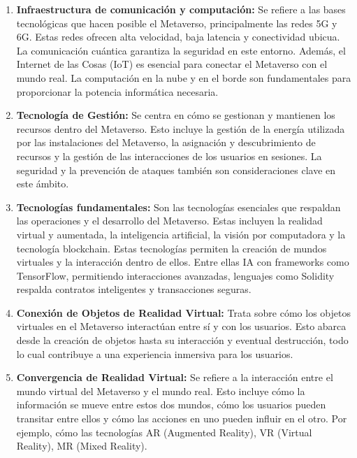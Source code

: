 \documentclass[a4paper,10pt]{article}
\begin{document}
	\begin{enumerate}
		\item \textbf{Infraestructura de comunicación y computación:} Se refiere a las bases tecnológicas que hacen posible el Metaverso, principalmente las redes 5G y 6G. Estas redes ofrecen alta velocidad, baja latencia y conectividad ubicua. La comunicación cuántica garantiza la seguridad en este entorno. Además, el Internet de las Cosas (IoT) es esencial para conectar el Metaverso con el mundo real. La computación en la nube y en el borde son fundamentales para proporcionar la potencia informática necesaria.
		
		\item \textbf{Tecnología de Gestión:} Se centra en cómo se gestionan y mantienen los recursos dentro del Metaverso. Esto incluye la gestión de la energía utilizada por las instalaciones del Metaverso, la asignación y descubrimiento de recursos y la gestión de las interacciones de los usuarios en sesiones. La seguridad y la prevención de ataques también son consideraciones clave en este ámbito.
		
		\item \textbf{Tecnologías fundamentales:} Son las tecnologías esenciales que respaldan las operaciones y el desarrollo del Metaverso. Estas incluyen la realidad virtual y aumentada, la inteligencia artificial, la visión por computadora y la tecnología blockchain. Estas tecnologías permiten la creación de mundos virtuales y la interacción dentro de ellos. Entre ellas IA con frameworks como TensorFlow, permitiendo interacciones avanzadas, lenguajes como Solidity respalda contratos inteligentes y transacciones seguras.
		
		\item \textbf{Conexión de Objetos de Realidad Virtual:} Trata sobre cómo los objetos virtuales en el Metaverso interactúan entre sí y con los usuarios. Esto abarca desde la creación de objetos hasta su interacción y eventual destrucción, todo lo cual contribuye a una experiencia inmersiva para los usuarios.
		
		\item \textbf{Convergencia de Realidad Virtual:} Se refiere a la interacción entre el mundo virtual del Metaverso y el mundo real. Esto incluye cómo la información se mueve entre estos dos mundos, cómo los usuarios pueden transitar entre ellos y cómo las acciones en uno pueden influir en el otro. Por ejemplo, cómo las tecnologías AR (Augmented Reality), VR (Virtual Reality), MR (Mixed Reality).
		
	\end{enumerate}
\end{document}

